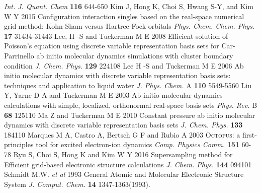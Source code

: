 \begin{thebibliography}{9}
\textit{Int. J. Quant. Chem} \textbf{116} 644-650
%
 Kim J, Hong K, Choi S, Hwang S-Y, and Kim W Y 2015
Configuration interaction singles based on the real-space numerical grid method:
Kohn-Sham versus Hartree-Fock orbitals
\textit{Phys. Chem. Chem. Phys.} \textbf{17} 31434-31443
%
 Lee, H -S and Tuckerman M E 2008
Efficient solution of Poisson's equation using discrete variable
representation basis sets for Car-Parrinello ab initio molecular
dynamics simulations with cluster boundary condition
\textit{J. Chem. Phys.} \textbf{129} 224108
%
 Lee H -S and Tuckerman M E 2006
Ab initio molecular dynamics with discrete variable representation basis sets:
techniques and application to liquid water
\textit{J. Phys. Chem.} A \textbf{110} 5549-5560
%
 Liu Y, Yarne D A and Tuckerman M E 2003
Ab initio molecular dynamics calculations with simple, localized, orthonormal
real-space basis sets
\textit{Phys. Rev.} B \textbf{68} 125110
%
 Ma Z and Tuckerman M E 2010
Constant pressure ab initio molecular dynamics with discrete variable representation basis sets
\textit{J. Chem. Phys.} \textbf{133} 184110
%
 Marques M A, Castro A, Bertsch G F and Rubio A 2003
\textsc{Octopus}: a first-principles tool for excited electron-ion dynamics
\textit{Comp. Physics Comm.} \textbf{151} 60-78
%
 Ryu S, Choi S, Hong K and Kim W Y 2016
Supersampling method for Efficient grid-based electronic structure calculations
\textit{J. Chem. Phys.} \textbf{144} 094101
%
 Schmidt M.W. \textit{et al} 1993
General Atomic and Molecular Electronic Structure System
\textit{J. Comput. Chem.} \textbf{14} 1347-1363(1993).
\end{thebibliography}